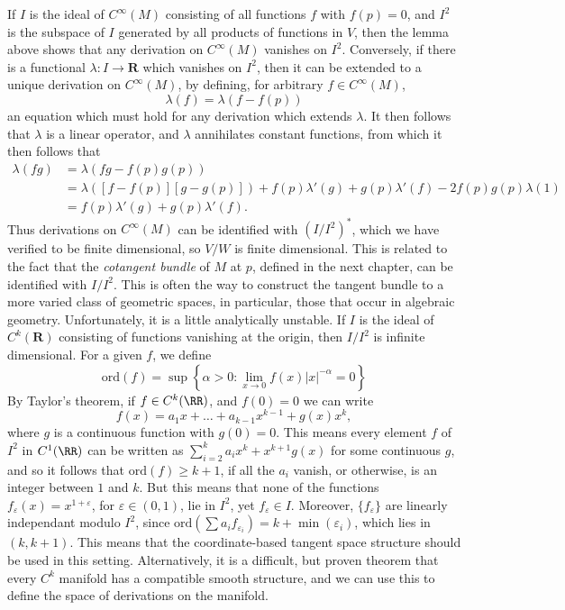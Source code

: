 \begin{remark}
If $I$ is the ideal of $C^\infty(M)$ consisting of all functions $f$ with $f(p) = 0$, and $I^2$ is the subspace of $I$ generated by all products of functions in $V$, then the lemma above shows that any derivation on $C^\infty(M)$ vanishes on $I^2$. Conversely, if there is a functional $\lambda: I \to \mathbf{R}$ which vanishes on $I^2$, then it can be extended to a unique derivation on $C^\infty(M)$, by defining, for arbitrary $f \in C^\infty(M)$,
%
\[ \lambda(f) = \lambda(f - f(p)) \]
%
an equation which must hold for any derivation which extends $\lambda$. It then follows that $\lambda$ is a linear operator, and $\lambda$ annihilates constant functions, from which it then follows that
%
\begin{align*}
    \lambda(fg) &= \lambda(fg - f(p)g(p))\\
    &= \lambda([f - f(p)][g - g(p)]) + f(p) \lambda'(g) + g(p) \lambda'(f) - 2 f(p) g(p) \lambda(1)\\
    &= f(p) \lambda'(g) + g(p) \lambda'(f).
\end{align*}
%
Thus derivations on $C^\infty(M)$ can be identified with $(I/I^2)^*$, which we have verified to be finite dimensional, so $V/W$ is finite dimensional. This is related to the fact that the \emph{cotangent bundle} of $M$ at $p$, defined in the next chapter, can be identified with $I/I^2$. This is often the way to construct the tangent bundle to a more varied class of geometric spaces, in particular, those that occur in algebraic geometry. Unfortunately, it is a little analytically unstable. If $I$ is the ideal of $C^k(\mathbf{R})$ consisting of functions vanishing at the origin, then $I/I^2$ is infinite dimensional. For a given $f$, we define
 \[ \text{ord}(f) = \sup \left\{ \alpha > 0 : \lim_{x \to 0} f(x) |x|^{-\alpha} = 0 \right\} \]
 By Taylor's theorem, if $f \in C^k(\RR)$, and $f(0) = 0$ we can write
 \[ f(x) = a_1x + \dots + a_{k-1} x^{k-1} + g(x) x^k, \]
 where $g$ is a continuous function with $g(0) = 0$. This means every element $f$ of $I^2$ in $C^1(\RR)$ can be written as $\sum_{i = 2}^k a_i x^k + x^{k+1} g(x)$ for some continuous $g$, and so it follows that $\text{ord}(f) \geq k+1$, if all the $a_i$ vanish, or otherwise, is an integer between $1$ and $k$. But this means that none of the functions $f_\varepsilon(x) = x^{1 + \varepsilon}$, for $\varepsilon \in (0,1)$, lie in $I^2$, yet $f_\varepsilon \in I$. Moreover, $\{ f_\varepsilon \}$ are linearly independant modulo $I^2$, since $\text{ord}(\sum a_i f_{\varepsilon_i}) = k + \min(\varepsilon_i)$, which lies in $(k,k+1)$. This means that the coordinate-based tangent space structure should be used in this setting. Alternatively, it is a difficult, but proven theorem that every $C^k$ manifold has a compatible smooth structure, and we can use this to define the space of derivations on the manifold.
\end{remark}

